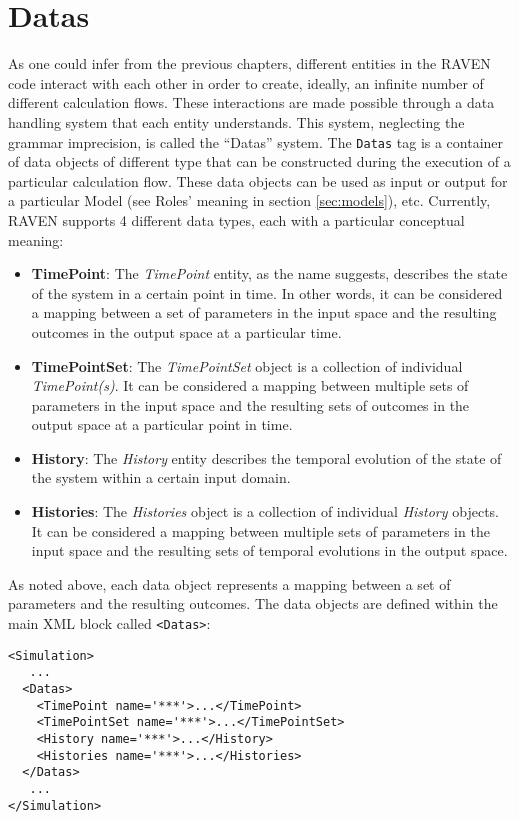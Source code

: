 \section{Datas  \\ \vspace{2 mm} {\small }}
\label{sec:Datas}
As one could infer from the previous chapters, different entities in the RAVEN 
code interact with each other in order to create, ideally, an infinite number of
different calculation flows.
%
These interactions are made possible through a data handling system that each
entity understands.
%
This system, neglecting the grammar imprecision,  is called the ``Datas''
system.
%
The \texttt{Datas} tag is a container of data objects of different type that can
be constructed during the execution of a particular calculation flow. These data
objects can be used as input or output for a particular Model (see Roles'
meaning in section \ref{sec:models}), etc. 
%
Currently, RAVEN supports 4 different data types, each with a particular
conceptual meaning:
\begin{itemize}
\item \textbf{TimePoint}: The \textit{TimePoint} entity, as the name suggests, 
describes the state of the system in a certain point in time.
%
In other words, it can be considered a mapping between a set of parameters in
the input space and the resulting outcomes in the output space at a particular
time.
\item \textbf{TimePointSet}: The \textit{TimePointSet} object is a collection of
individual \textit{TimePoint(s)}.
%
It can be considered a mapping between multiple sets of parameters in the input
space and the resulting sets of outcomes in the output space at a particular
point in time.
\item \textbf{History}:  The \textit{History} entity describes the temporal
evolution of the state of the system within a certain input domain.
\item \textbf{Histories}:  The \textit{Histories} object is a collection of 
individual \textit{History} objects.
%
It can be considered a mapping between multiple sets of parameters in the input
space and the resulting sets of temporal evolutions in the output space.
\end{itemize}
As noted above, each data object represents a mapping between a set of
parameters and the resulting outcomes.
%
The data objects are defined within the main XML block called \texttt{<Datas>}:
\begin{lstlisting}[style=XML]
<Simulation>
   ...
  <Datas> 
    <TimePoint name='***'>...</TimePoint>
    <TimePointSet name='***'>...</TimePointSet>
    <History name='***'>...</History>
    <Histories name='***'>...</Histories>
  </Datas>
   ...
</Simulation>
\end{lstlisting}

